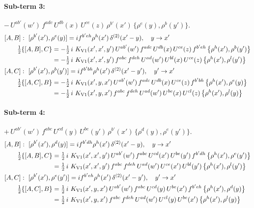 \documentclass[10pt]{article}
\numberwithin{equation}{section}
\begin{document}
\paragraph{Sub-term 3:} $-\,U^{ab'}(w')\,f^{adc}\,U^{db}(x)\,U^{ce}(z)\,\rho^{b'}(x')\,\big\{\rho^{e}(y),\rho^{b}(y')\big\}$.
\begin{align}
&[A,B]:\ [\rho^{b'}(x'),\rho^{e}(y)]=i f^{b'eh}\rho^{h}(x')\,\delta^{(2)}(x'-y),\quad y\to x'\notag\\
&\qquad \tfrac12\{[A,B],C\}=-\tfrac12\,i\,\,K_{\rm V1}(x',x',y')\,U^{ab'}(w')\,f^{adc}\,U^{db}(x)\,U^{ce}(z)\,f^{b'eh}\,\big\{\rho^{h}(x'),\rho^{b}(y')\big\}\notag\\
&\qquad\phantom{\tfrac12\{[A,B],C\}}=-\tfrac12\,i\,\,K_{\rm V1}(x',x',y')\,f^{abc}\,f^{deh}\,U^{ad}(w')\,U^{bl}(x)\,U^{ce}(z)\,\big\{\rho^{h}(x'),\rho^{l}(y')\big\}
\label{R:eq:GI.V1-3-AB}\\
&[A,C]:\ [\rho^{b'}(x'),\rho^{b}(y')]=i f^{b'bh}\rho^{h}(x')\,\delta^{(2)}(x'-y'),\quad y'\to x'\notag\\
&\qquad \tfrac12\{[A,C],B\}=-\tfrac12\,i\,\,K_{\rm V1}(x',y,x')\,U^{ab'}(w')\,f^{adc}\,U^{db}(x)\,U^{ce}(z)\,f^{b'bh}\,\big\{\rho^{h}(x'),\rho^{e}(y)\big\}\notag\\
&\qquad\phantom{\tfrac12\{[A,C],B\}}=-\tfrac12\,i\,\,K_{\rm V1}(x',y,x')\,f^{abc}\,f^{deh}\,U^{ad}(w')\,U^{be}(x)\,U^{cl}(z)\,\big\{\rho^{h}(x'),\rho^{l}(y)\big\}
\label{R:eq:GI.V1-3-AC}
\end{align}
\paragraph{Sub-term 4:} $+\,U^{ab'}(w')\,f^{abc}\,U^{cd}(y)\,U^{be}(y')\,\rho^{b'}(x')\,\big\{\rho^{d}(y),\rho^{e}(y')\big\}$.
\begin{align}
&[A,B]:\ [\rho^{b'}(x'),\rho^{d}(y)]=i f^{b'dh}\rho^{h}(x')\,\delta^{(2)}(x'-y),\quad y\to x'\notag\\
&\qquad \tfrac12\{[A,B],C\}=\tfrac12\,i\,\,K_{\rm V1}(x',x',y')\,U^{ab'}(w')\,f^{abc}\,U^{cd}(x')\,U^{be}(y')\,f^{b'dh}\,\big\{\rho^{h}(x'),\rho^{e}(y')\big\}\notag\\
&\qquad\phantom{\tfrac12\{[A,B],C\}}=\tfrac12\,i\,\,K_{\rm V1}(x',x',y')\,f^{abc}\,f^{deh}\,U^{ad}(w')\,U^{ce}(x')\,U^{bl}(y')\,\big\{\rho^{h}(x'),\rho^{l}(y')\big\}
\label{R:eq:GI.V1-4-AB}\\
&[A,C]:\ [\rho^{b'}(x'),\rho^{e}(y')]=i f^{b'eh}\rho^{h}(x')\,\delta^{(2)}(x'-y'),\quad y'\to x'\notag\\
&\qquad \tfrac12\{[A,C],B\}=\tfrac12\,i\,\,K_{\rm V1}(x',y,x')\,U^{ab'}(w')\,f^{abc}\,U^{cd}(y)\,U^{be}(x')\,f^{b'eh}\,\big\{\rho^{h}(x'),\rho^{d}(y)\big\}\notag\\
&\qquad\phantom{\tfrac12\{[A,C],B\}}=\tfrac12\,i\,\,K_{\rm V1}(x',y,x')\,f^{abc}\,f^{deh}\,U^{ad}(w')\,U^{cl}(y)\,U^{be}(x')\,\big\{\rho^{h}(x'),\rho^{l}(y)\big\}
\label{R:eq:GI.V1-4-AC}
\end{align}
\end{document}

